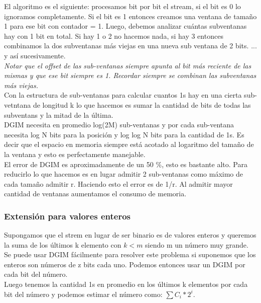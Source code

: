 \documentclass[titlepage,a4paper]{article}
\begin{document}
 El algoritmo es el siguiente: procesamos bit por bit el stream, si el bit es 0 lo ignoramos completamente. Si el bit es 1 entonces creamos una ventana de tamaño 1 para ese bit con contador = 1. Luego, debemos analizar cuántas subventanas hay con 1 bit en total. Si hay 1 o 2 no hacemos nada, si hay 3 entonces combinamos la dos subventanas más viejas en una nueva sub ventana de 2 bits. ... y así sucesivamente. \\
 
\textit{Notar que el offset de las sub-ventanas siempre apunta al bit más reciente de las mismas y que ese bit siempre es 1. Recordar siempre se combinan las subventanas más viejas.  }\\

Con la estructura de sub-ventanas para calcular cuantos 1s hay en una cierta  sub-vetntana de longitud k lo que hacemos es sumar la cantidad de bits de todas las subventans y la mitad de la última. \\

DGIM necesita en promedio log(2M) sub-ventanas y por cada sub-ventana necesita log N bits para la posición y log log N bits para la cantidad de 1s. Es decir que el espacio en memoria siempre está acotado al logaritmo del tamaño de la ventana y esto es perfectamente manejable. \\

El error de DGIM es aproximadamente de un 50 \%, esto es bastante alto. Para reducirlo lo que hacemos es en lugar admitir 2 sub-ventanas como máximo de cada tamaño admitir r. Haciendo esto el error es de 1/r. Al admitir mayor cantidad de ventanas aumentamos el consumo de memoria. 

\subsubsection*{Extensión para valores enteros}
Supongamos que el strem en lugar de ser binario es de valores enteros y queremos la suma de los últimos k elemento con $k<m$ siendo m un número muy grande. \\

Se puede usar DGIM fácilmente para resolver este problema si suponemos que los enteros son números de z bits cada uno. Podemos entonces usar un DGIM por cada bit del número. \\

Luego tenemos la cantidad 1s en promedio en los últimos k elementos por cada bit del número y podemos estimar el número como: $\sum C_i * 2^i$.
\end{document}
